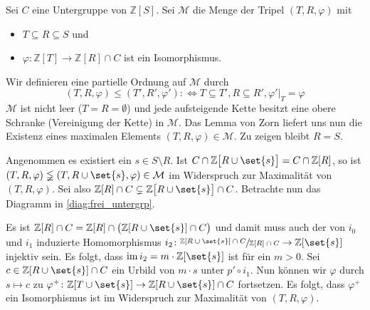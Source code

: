\begin{beweis}
	Sei $C$ eine Untergruppe von $\mathbb{Z}[S]$. Sei $\mathcal{M}$ die Menge der Tripel $(T,R,\varphi)$ mit
	\begin{itemize}[itemsep=0pt,topsep=1ex]
		\item $T \subseteq R \subseteq S$ und
		\item $\varphi \colon \mathbb{Z}[T] \to \mathbb{Z}[R] \cap C$ ist ein Isomorphismus.
	\end{itemize}
	Wir definieren eine partielle Ordnung auf $\mathcal{M}$ durch
	\[
		(T,R,\varphi) \le (T',R',\varphi') :\iff T \subseteq T', R \subseteq R', \varphi'|_{T}=\varphi
	\]
	$\mathcal{M}$ ist nicht leer ($T=R=\emptyset$) und jede aufsteigende Kette besitzt eine obere Schranke (Vereinigung der Kette) in $\mathcal{M}$.
	Das Lemma von Zorn liefert uns nun die Existenz eines maximalen Elements $(T,R,\varphi) \in \mathcal{M}$. Zu zeigen bleibt $R=S$. 
	
	Angenommen es existiert ein $s \in S \setminus R$.
	Ist $C \cap \mathbb{Z} \benbrace[\big]{R \cup \set{s}} = C \cap \mathbb{Z}[R]$, so ist $(T,R,\varphi) \lneqq (T,R \cup \set{s},\varphi) \in \mathcal{M}$ im Widerspruch zur Maximalität von $(T,R,\varphi)$. 
	Sei also $\mathbb{Z}[R] \cap C \subsetneq \mathbb{Z}\benbrace[\big]{R \cup \set{s}} \cap C$. 
	Betrachte nun das Diagramm in \cref{diag:frei_untergrp}.
	\begin{figure}[t]
	\end{figure}
	Es ist $\mathbb{Z}[R] \cap C  = \mathbb{Z}[R] \cap \enbrace[\big]{\mathbb{Z}[R \cup \set{s}] \cap C}$ und damit muss auch der von $i_0$ und $i_1$ induzierte Homomorphismus $i_2 \colon \sfrac{\mathbb{Z}[R \cup \set{s}] \cap C}{\mathbb{Z}[R] \cap C} \to \mathbb{Z}[\set{s}]$ injektiv sein. 
	Es folgt, dass $\im i_2 = m \cdot \mathbb{Z}\benbrace*{\set{s}}$ ist für ein $m >0$. 
	Sei $c \in \mathbb{Z}[R \cup \set{s}] \cap C$ ein Urbild von $m \cdot s$ unter $p' \circ i_1$. 
	Nun können wir $\varphi$ durch $s \mapsto c$ zu $\varphi^+ \colon \mathbb{Z}\benbrace*{T \cup\set{s}} \to \mathbb{Z}\benbrace*{R \cup \set{s}}\cap C$ fortsetzen. 
	Es folgt, dass $\varphi^+$ ein Isomorphismus ist im Widerspruch zur Maximalität von $(T,R,\varphi)$.
\end{beweis}

